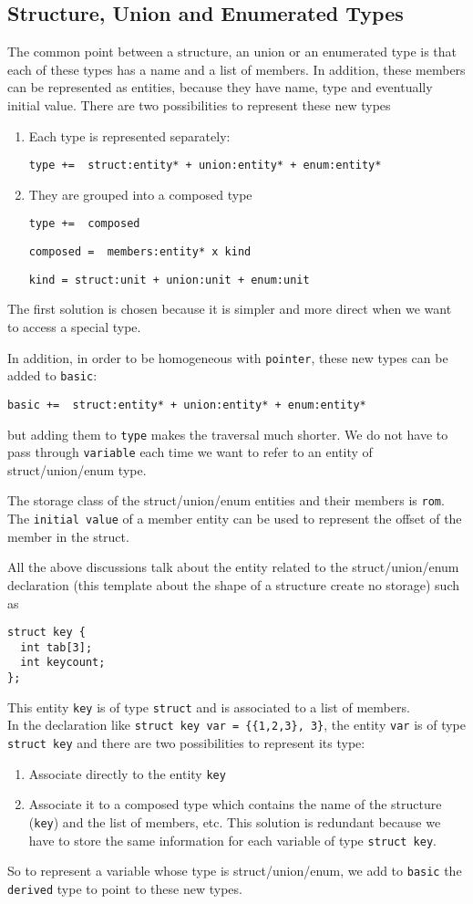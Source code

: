 \documentclass[a4paper]{article}
\begin{document}
\subsection{Structure, Union and Enumerated Types} 
The common point between  a structure, an union or an enumerated type is that each of these
types has a name and a list of members. In addition, these 
 members can be represented as entities, because they have name,
type and eventually initial value. There are two possibilities to
represent these new types
\begin{enumerate}
\item Each type is represented separately:

\verb/type +=  struct:entity* + union:entity* + enum:entity*/ 
\item They are grouped into a composed type

\verb/type +=  composed/ 

\verb/composed =  members:entity* x kind/

\verb/kind = struct:unit + union:unit + enum:unit/
\end{enumerate}
The first solution is chosen because it is simpler and more direct when
we want to access a special type. 

In addition, in order to be homogeneous with \verb/pointer/, these
new types can be added to \verb/basic/:

\verb/basic +=  struct:entity* + union:entity* + enum:entity*/ 

but adding them to \verb/type/ makes the traversal much shorter. We do
not have to pass through \verb/variable/ each time we want to refer to an
entity of struct/union/enum type. 

The storage class of the struct/union/enum entities and their
members is \verb/rom/. The \verb/initial value/ of a member entity can be used to represent
the offset of the member in the struct.   

All the above discussions talk about the entity related to the
struct/union/enum declaration (this template about the shape of a
structure create no storage) such as 
\begin{verbatim}
struct key {
  int tab[3];
  int keycount;
};
\end{verbatim}
This entity \verb/key/ is of type \verb/struct/ and is associated to a list
of members.\\

In the declaration like \verb/struct key var = {{1,2,3}, 3}/, the entity
\verb/var/ is of type \verb/struct key/ and there are two possibilities to
represent its type: 
\begin{enumerate}
\item Associate directly  to the entity \verb/key/
\item Associate it to a composed type which contains the name of the structure (\verb/key/)
and the list of
members, etc. This solution is redundant because we have to store the same
information for each variable of type
\verb/struct key/. 
\end{enumerate}
So to represent a variable whose type is struct/union/enum, we add to \verb/basic/ the \verb/derived/ type to point to
these new types. 
\end{document}
